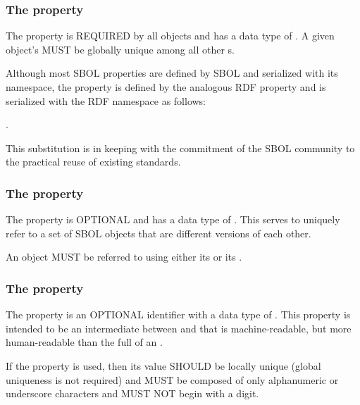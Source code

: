 \subsubsection*{The  property}
\label{sec:identity}
The  property is REQUIRED by all  objects and has a data type of . A given  object's   MUST be globally unique among all other  s. 

Although most SBOL properties are defined by SBOL and serialized with its namespace, the  property is defined by the analogous RDF  property and is serialized with the RDF namespace as follows:

.

This substitution is in keeping with the commitment of the SBOL community to the practical reuse of existing standards.

\subsubsection*{The  property}
\label{sec:persistentIdentity}
The  property is OPTIONAL and has a data type of . This  serves to uniquely refer to a set of SBOL objects that are different versions of each other. 

An  object MUST be referred to using either its   or its  .

\subsubsection*{The  property}
\label{sec:displayId}
The  property is an OPTIONAL identifier with a data type of . This property is intended to be an intermediate between  and  that is machine-readable, but more human-readable than the full  of an . 

If the  property is used, then its  value SHOULD be locally unique (global uniqueness is not required) and MUST be composed of only alphanumeric or underscore characters and MUST NOT begin with a digit.


